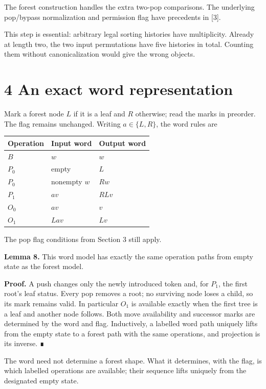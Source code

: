 \documentclass[11pt,letterpaper]{article}
\begin{document}
The forest construction handles the extra two-pop comparisons. The
underlying pop/bypass normalization and permission flag have precedents
in {[}3{]}.

This step is essential: arbitrary legal sorting histories have
multiplicity. Already at length two, the two input permutations have
five histories in total. Counting them without canonicalization would
give the wrong objects.

\section{4 An exact word
representation}\label{an-exact-word-representation}

Mark a forest node \(L\) if it is a leaf and \(R\) otherwise; read the
marks in preorder. The flag remains unchanged. Writing \(a\in\{L,R\}\),
the word rules are

\begin{longtable}[]{@{}lll@{}}
\toprule\noalign{}
Operation & Input word & Output word \\
\midrule\noalign{}
\endhead
\bottomrule\noalign{}
\endlastfoot
\(B\) & \(w\) & \(w\) \\
\(P_0\) & empty & \(L\) \\
\(P_0\) & nonempty \(w\) & \(Rw\) \\
\(P_1\) & \(av\) & \(RLv\) \\
\(O_0\) & \(av\) & \(v\) \\
\(O_1\) & \(Lav\) & \(Lv\) \\
\end{longtable}

The pop flag conditions from Section 3 still apply.

\textbf{Lemma 8.} This word model has exactly the same operation paths
from empty state as the forest model.

\textbf{Proof.} A push changes only the newly introduced token and, for
\(P_1\), the first root's leaf status. Every pop removes a root; no
surviving node loses a child, so its mark remains valid. In particular
\(O_1\) is available exactly when the first tree is a leaf and another
node follows. Both move availability and successor marks are determined
by the word and flag. Inductively, a labelled word path uniquely lifts
from the empty state to a forest path with the same operations, and
projection is its inverse. ∎

The word need not determine a forest shape. What it determines, with the
flag, is which labelled operations are available; their sequence lifts
uniquely from the designated empty state.
\end{document}
